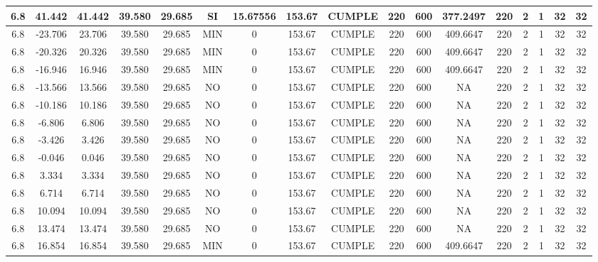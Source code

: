 \begin{table}[h]
{\begin{tabular}{|c|c|c|c|c|c|c|c|c|c|c|c|c|c|c|c|c|}
    \hline
    6.8 & 41.442 & 41.442 & 39.580 & 29.685 & SI  & 15.67556 & 153.67 & CUMPLE & 220 & 600 & 377.2497 & 220 & 2   & 1   & 32  & 32 \bigstrut\\
    \hline
    6.8 & -23.706 & 23.706 & 39.580 & 29.685 & MIN & 0   & 153.67 & CUMPLE & 220 & 600 & 409.6647 & 220 & 2   & 1   & 32  & 32 \bigstrut\\
    \hline
    6.8 & -20.326 & 20.326 & 39.580 & 29.685 & MIN & 0   & 153.67 & CUMPLE & 220 & 600 & 409.6647 & 220 & 2   & 1   & 32  & 32 \bigstrut\\
    \hline
    6.8 & -16.946 & 16.946 & 39.580 & 29.685 & MIN & 0   & 153.67 & CUMPLE & 220 & 600 & 409.6647 & 220 & 2   & 1   & 32  & 32 \bigstrut\\
    \hline
    6.8 & -13.566 & 13.566 & 39.580 & 29.685 & NO  & 0   & 153.67 & CUMPLE & 220 & 600 & NA  & 220 & 2   & 1   & 32  & 32 \bigstrut\\
    \hline
    6.8 & -10.186 & 10.186 & 39.580 & 29.685 & NO  & 0   & 153.67 & CUMPLE & 220 & 600 & NA  & 220 & 2   & 1   & 32  & 32 \bigstrut\\
    \hline
    6.8 & -6.806 & 6.806 & 39.580 & 29.685 & NO  & 0   & 153.67 & CUMPLE & 220 & 600 & NA  & 220 & 2   & 1   & 32  & 32 \bigstrut\\
    \hline
    6.8 & -3.426 & 3.426 & 39.580 & 29.685 & NO  & 0   & 153.67 & CUMPLE & 220 & 600 & NA  & 220 & 2   & 1   & 32  & 32 \bigstrut\\
    \hline
    6.8 & -0.046 & 0.046 & 39.580 & 29.685 & NO  & 0   & 153.67 & CUMPLE & 220 & 600 & NA  & 220 & 2   & 1   & 32  & 32 \bigstrut\\
    \hline
    6.8 & 3.334 & 3.334 & 39.580 & 29.685 & NO  & 0   & 153.67 & CUMPLE & 220 & 600 & NA  & 220 & 2   & 1   & 32  & 32 \bigstrut\\
    \hline
    6.8 & 6.714 & 6.714 & 39.580 & 29.685 & NO  & 0   & 153.67 & CUMPLE & 220 & 600 & NA  & 220 & 2   & 1   & 32  & 32 \bigstrut\\
    \hline
    6.8 & 10.094 & 10.094 & 39.580 & 29.685 & NO  & 0   & 153.67 & CUMPLE & 220 & 600 & NA  & 220 & 2   & 1   & 32  & 32 \bigstrut\\
    \hline
    6.8 & 13.474 & 13.474 & 39.580 & 29.685 & NO  & 0   & 153.67 & CUMPLE & 220 & 600 & NA  & 220 & 2   & 1   & 32  & 32 \bigstrut\\
    \hline
    6.8 & 16.854 & 16.854 & 39.580 & 29.685 & MIN & 0   & 153.67 & CUMPLE & 220 & 600 & 409.6647 & 220 & 2   & 1   & 32  & 32 \bigstrut\\

\end{tabular}}
\end{table}
